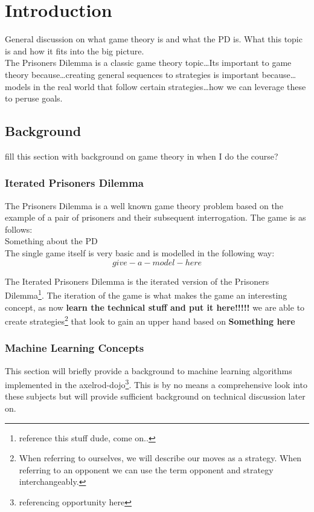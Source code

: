 
\chapter{Introduction}\label{ch:intro}

General discussion on what game theory is and what the PD is. What this topic is and how it fits into the big picture.\\

The Prisoners Dilemma is a classic game theory topic\ldots  Its important to game theory because\ldots  creating general sequences to strategies is important because\ldots  models in the real world that follow certain strategies\ldots  how we can leverage these to peruse goals.

    \section{Background}
        fill this section with background on game theory in when I do the course?
        \subsection{Iterated Prisoners Dilemma}\label{ssec:IPD}
        The Prisoners Dilemma is a well known game theory problem based on the example of a pair of prisoners and their subsequent interrogation. The game is as follows:\\ 

        Something about the PD \\ 

        The single game itself is very basic and is modelled in the following way: \\ 

        \[give-a-model-here\]

        The Iterated Prisoners Dilemma is the iterated version of the Prisoners Dilemma\footnote{reference this stuff dude, come on..}. The iteration of the game is what makes the game an interesting concept, as now \textbf{learn the technical stuff and put it here!!!!!} we are able to create strategies\footnote{When referring to ourselves, we will describe our moves as a strategy. When referring to an opponent we can use the term opponent and strategy interchangeably.} that look to gain an upper hand based on \textbf{Something here}

        
        \subsection{Machine Learning Concepts}
        This section will briefly provide a background to machine learning algorithms implemented in the axelrod-dojo\footnote{referencing opportunity here}. This is by no means a comprehensive look into these subjects but will provide sufficient background on technical discussion later on.
